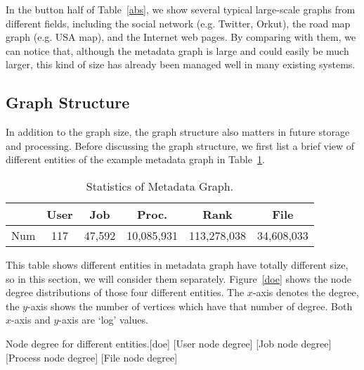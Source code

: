 In the button half of Table~\ref{abs}, we show several typical large-scale graphs from different fields, including the social network (e.g. Twitter, Orkut), the road map graph (e.g. USA map), and the Internet web pages. By comparing with them, we can notice that, although the metadata graph is large and could easily be much larger, this kind of size has already been managed well in many existing systems.

\subsection{Graph Structure}
In addition to the graph size, the graph structure also matters in future storage and processing. Before discussing the graph structure, we first list a brief view of different entities of the example metadata graph in Table~\ref{smg}.

\begin{table}[h]
\caption{Statistics of Metadata Graph.}
  \label{smg}
\centering
\begin{tabular}{|c|c|c|c|c|c|}
\hline
 & User  & Job  & Proc.   & Rank     & File     \\ \hline
 Num & 117      & 47,592  & 10,085,931 & 113,278,038 & 34,608,033 \\ \hline
\end{tabular}
\end{table}

This table shows different entities in metadata graph have totally different size, so in this section, we will consider them separately. Figure~\ref{doe} shows the node degree distributions of those four different entities. The $x$-axis denotes the degree, the $y$-axis shows the number of vertices which have that number of degree. Both $x$-axis and $y$-axis are `log' values. 


   \begin{Figure}{Node degree for different entities.}[doe]
     [User node degree]
     [Job node degree]\\     
     [Process node degree]
     [File node degree]
   \end{Figure}
  

